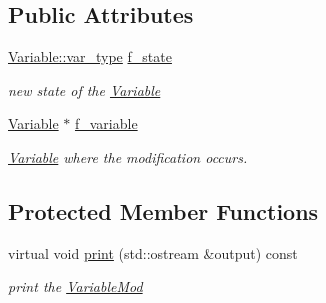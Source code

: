 \subsection*{Public Attributes}
\begin{DoxyCompactItemize}
\item 
\mbox{\label{class_s_m_spp__di__unipi__it_1_1_variable_mod_a0449c4d48b276a874f9b29eec1e0561b}} 
\mbox{\hyperlink{class_s_m_spp__di__unipi__it_1_1_variable_a32378add5594ab0f1fb45e711d88924d}{Variable\+::var\+\_\+type}} \mbox{\hyperlink{class_s_m_spp__di__unipi__it_1_1_variable_mod_a0449c4d48b276a874f9b29eec1e0561b}{f\+\_\+state}}
\begin{DoxyCompactList}\small\item\em new state of the \mbox{\hyperlink{class_s_m_spp__di__unipi__it_1_1_variable}{Variable}} \end{DoxyCompactList}\item 
\mbox{\label{class_s_m_spp__di__unipi__it_1_1_variable_mod_afe89817401710644566155ae096a3465}} 
\mbox{\hyperlink{class_s_m_spp__di__unipi__it_1_1_variable}{Variable}} $\ast$ \mbox{\hyperlink{class_s_m_spp__di__unipi__it_1_1_variable_mod_afe89817401710644566155ae096a3465}{f\+\_\+variable}}
\begin{DoxyCompactList}\small\item\em \mbox{\hyperlink{class_s_m_spp__di__unipi__it_1_1_variable}{Variable}} where the modification occurs. \end{DoxyCompactList}\end{DoxyCompactItemize}
\subsection*{Protected Member Functions}
\begin{DoxyCompactItemize}
\item 
\mbox{\label{class_s_m_spp__di__unipi__it_1_1_variable_mod_a2e7b9c9148a98c5c342e8c25cac95926}} 
virtual void \mbox{\hyperlink{class_s_m_spp__di__unipi__it_1_1_variable_mod_a2e7b9c9148a98c5c342e8c25cac95926}{print}} (std\+::ostream \&output) const
\begin{DoxyCompactList}\small\item\em print the \mbox{\hyperlink{class_s_m_spp__di__unipi__it_1_1_variable_mod}{Variable\+Mod}} \end{DoxyCompactList}\end{DoxyCompactItemize}
